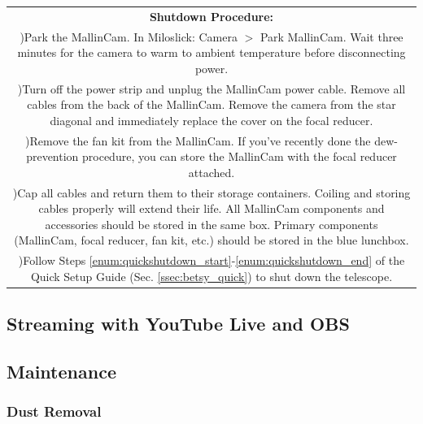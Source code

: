 \documentclass[12pt,titlepage]{article}
\newcounter{rowcount}
\newcommand{\step}{\stepcounter{rowcount}\therowcount)\hspace*{\tabcolsep}}
\begin{document}
\begin{longtable}{c}
	\textbf{Shutdown Procedure:}\\    
	
	    \multicolumn{1}{m{\textwidth}}{\step Park the MallinCam. In Miloslick: Camera $>$ Park MallinCam. Wait three minutes for the camera to warm to ambient temperature before disconnecting power.} \\
	    
	    \multicolumn{1}{m{\textwidth}}{\step Turn off the power strip and unplug the MallinCam power cable. Remove all cables from the back of the MallinCam. Remove the camera from the star diagonal and immediately replace the cover on the focal reducer.} \\
	    
	   \multicolumn{1}{m{\textwidth}}{\step Remove the fan kit from the MallinCam. If you've recently done the dew-prevention procedure, you can store the MallinCam with the focal reducer attached.} \\
	    
    \multicolumn{1}{m{\textwidth}}{\step Cap all cables and return them to their storage containers. Coiling and storing cables properly will extend their life. All MallinCam components and accessories should be stored in the same box. Primary components (MallinCam, focal reducer, fan kit, etc.) should be stored in the blue lunchbox.} \\
    
    \multicolumn{1}{m{\textwidth}}{\step Follow Steps \ref{enum:quickshutdown_start}-\ref{enum:quickshutdown_end} of the Quick Setup Guide (Sec. \ref{ssec:betsy_quick}) to shut down the telescope.} \\
\end{longtable}
\setcounter{rowcount}{0}

\subsection{Streaming with YouTube Live and OBS}
\subsection{Maintenance}
\subsubsection{Dust Removal}
\end{document}
